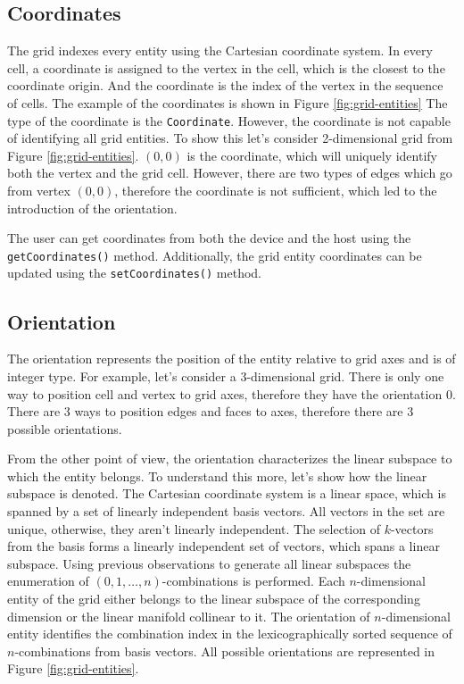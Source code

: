 \subsection{Coordinates}

The grid indexes every entity using the Cartesian coordinate system.
In every cell, a coordinate is assigned to the vertex in the cell, which is the closest to the coordinate origin.
And the coordinate is the index of the vertex in the sequence of cells.
The example of the coordinates is shown in Figure \ref{fig:grid-entities}
The type of the coordinate is the \texttt{Coordinate}.
However, the coordinate is not capable of identifying all grid entities.
To show this let's consider 2-dimensional grid from Figure \ref{fig:grid-entities}.
\((0, 0)\) is the coordinate, which will uniquely identify both the vertex and the grid cell.
However, there are two types of edges which go from vertex \((0, 0)\), therefore the coordinate is not sufficient, which led to the introduction of the orientation.

The user can get coordinates from both the device and the host using the \texttt{getCoordinates()} method.
Additionally, the grid entity coordinates can be updated using the \texttt{setCoordinates()} method.

\subsection{Orientation}

The orientation represents the position of the entity relative to grid axes and is of integer type.
For example, let's consider a 3-dimensional grid.
There is only one way to position cell and vertex to grid axes, therefore they have the orientation \(0\).
There are 3 ways to position edges and faces to axes, therefore there are 3 possible orientations.

From the other point of view, the orientation characterizes the linear subspace to which the entity belongs.
To understand this more, let's show how the linear subspace is denoted.
The Cartesian coordinate system is a linear space, which is spanned by a set of linearly independent basis vectors.
All vectors in the set are unique, otherwise, they aren't linearly independent.
The selection of \(k\)-vectors from the basis forms a linearly independent set of vectors, which spans a linear subspace.
Using previous observations to generate all linear subspaces the enumeration of \((0, 1, \dots, n)\)-combinations is performed.
Each \(n\)-dimensional entity of the grid either belongs to the linear subspace of the corresponding dimension or the linear manifold collinear to it.
The orientation of \(n\)-dimensional entity identifies the combination index in the lexicographically sorted sequence of \(n\)-combinations from basis vectors.
All possible orientations are represented in Figure \ref{fig:grid-entities}.

